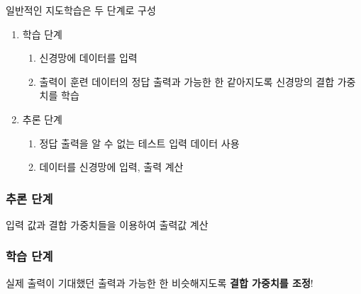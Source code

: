 \documentclass[]{article}
\begin{document}
일반적인 지도학습은 두 단계로 구성

\begin{enumerate}
\def\labelenumi{\arabic{enumi}.}
\item
  학습 단계

  \begin{enumerate}
  \def\labelenumii{\arabic{enumii}.}
  \item
    신경망에 데이터를 입력
  \item
    출력이 훈련 데이터의 정답 출력과 가능한 한 같아지도록 신경망의 결합
    가중치를 학습
  \end{enumerate}
\item
  추론 단계

  \begin{enumerate}
  \def\labelenumii{\arabic{enumii}.}
  \item
    정답 출력을 알 수 없는 테스트 입력 데이터 사용
  \item
    데이터를 신경망에 입력, 출력 계산
  \end{enumerate}
\end{enumerate}

\hypertarget{header-n66}{%
\subsubsection{추론 단계}\label{header-n66}}

입력 값과 결합 가중치들을 이용하여 출력값 계산

\hypertarget{header-n68}{%
\subsubsection{학습 단계}\label{header-n68}}

실제 출력이 기대했던 출력과 가능한 한 비슷해지도록 \textbf{결합 가중치를
조정}!
\end{document}
